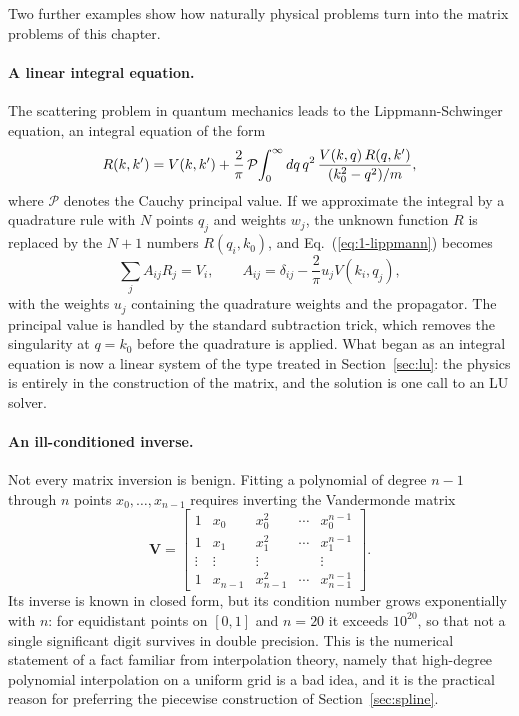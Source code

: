Two further examples show how naturally physical problems turn into the
matrix problems of this chapter.

\paragraph{A linear integral equation.}
The scattering problem in quantum mechanics leads to the Lippmann-Schwinger
equation, an integral equation of the form
\begin{equation}
  R(k,k') = V(k,k')
    + \frac{2}{\pi}\,\mathcal{P}\!\int_0^{\infty}
       dq\, q^2\,
       \frac{V(k,q)\,R(q,k')}{(k_0^2-q^2)/m},
  \label{eq:1-lippmann}
\end{equation}
where $\mathcal{P}$ denotes the Cauchy principal value.  If we approximate the
integral by a quadrature rule with $N$ points $q_j$ and weights $w_j$, the
unknown function $R$ is replaced by the $N+1$ numbers $R(q_i,k_0)$, and
Eq.~(\ref{eq:1-lippmann}) becomes
\begin{equation}
  \sum_{j} A_{ij} R_j = V_i,
  \qquad
  A_{ij} = \delta_{ij} - \frac{2}{\pi} u_j V(k_i,q_j) ,
  \label{eq:1-lippmannmat}
\end{equation}
with the weights $u_j$ containing the quadrature weights and the propagator.
The principal value is handled by the standard subtraction trick, which
removes the singularity at $q=k_0$ before the quadrature is applied.  What
began as an integral equation is now a linear system of the type treated in
Section~\ref{sec:lu}: the physics is entirely in the construction of the
matrix, and the solution is one call to an LU solver.

\paragraph{An ill-conditioned inverse.}
Not every matrix inversion is benign.  Fitting a polynomial of degree $n-1$
through $n$ points $x_0,\dots,x_{n-1}$ requires inverting the Vandermonde
matrix
\begin{equation}
  \bm{V} =
  \begin{bmatrix}
    1 & x_0 & x_0^2 & \cdots & x_0^{n-1}\\
    1 & x_1 & x_1^2 & \cdots & x_1^{n-1}\\
    \vdots & \vdots & \vdots & & \vdots\\
    1 & x_{n-1} & x_{n-1}^2 & \cdots & x_{n-1}^{n-1}
  \end{bmatrix}.
  \label{eq:1-vandermonde}
\end{equation}
Its inverse is known in closed form, but its condition number grows
exponentially with $n$: for equidistant points on $[0,1]$ and $n=20$ it
exceeds $10^{20}$, so that not a single significant digit survives in double
precision.  This is the numerical statement of a fact familiar from
interpolation theory, namely that high-degree polynomial interpolation on a
uniform grid is a bad idea, and it is the practical reason for preferring the
piecewise construction of Section~\ref{sec:spline}.

